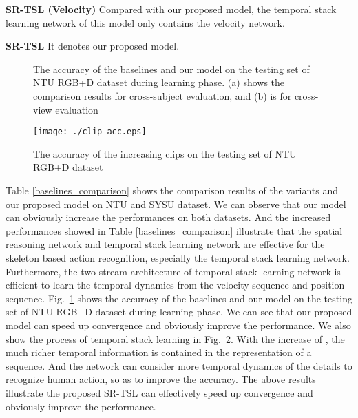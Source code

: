 \documentclass[runningheads]{llncs}
\begin{document}
\textbf{SR-TSL (Velocity)}\hspace{2mm} Compared with our proposed model, the temporal stack learning network of this model only contains the velocity network.

\textbf{SR-TSL }\hspace{2mm} It denotes our proposed model.

\begin{figure}[!t]
\centering
\caption{The accuracy of the baselines and our model on the testing set of NTU RGB+D dataset during learning phase. (a) shows the comparison results for cross-subject evaluation, and (b) is for cross-view evaluation}
\label{acc}
\end{figure}


\begin{figure}[!b]
\centering
\texttt{[image: ./clip\_acc.eps]}
\caption{The accuracy of the increasing clips on the testing set of NTU RGB+D dataset}
\label{clip_acc}
\end{figure}

Table \ref{baselines_comparison} shows the comparison results of the variants and our proposed model on NTU and SYSU dataset. We can observe that our model can obviously increase the performances on both datasets. And the increased performances showed in Table \ref{baselines_comparison} illustrate that the spatial reasoning network and temporal stack learning network are effective for the skeleton based action recognition, especially the temporal stack learning network. Furthermore, the two stream architecture of temporal stack learning network is efficient to learn the temporal dynamics from the velocity sequence and position sequence. Fig.~\ref{acc} shows the accuracy of the baselines and our model on the testing set of NTU RGB+D dataset during learning phase. We can see that our proposed model can speed up convergence and obviously improve the performance. We also show the process of temporal stack learning in Fig.~\ref{clip_acc}. With the increase of , the much richer temporal information is contained in the representation of a sequence.
And the network can consider more temporal dynamics of the details to recognize human action, so as to improve the accuracy. The above results illustrate the proposed SR-TSL can effectively speed up convergence and obviously improve the performance.
\end{document}
